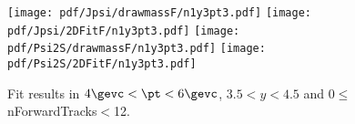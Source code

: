 \begin{figure}[H]
\begin{center}
\texttt{[image: pdf/Jpsi/drawmassF/n1y3pt3.pdf]}
\texttt{[image: pdf/Jpsi/2DFitF/n1y3pt3.pdf]}
\vspace*{-0.5cm}
\texttt{[image: pdf/Psi2S/drawmassF/n1y3pt3.pdf]}
\texttt{[image: pdf/Psi2S/2DFitF/n1y3pt3.pdf]}
\vspace*{-0.5cm}
\end{center}
\caption{Fit results in $4\gevc<\pt<6\gevc$, $3.5<y<4.5$ and 0$\leq$nForwardTracks$<$12.}
\label{Fitn1y3pt3}
\end{figure}
